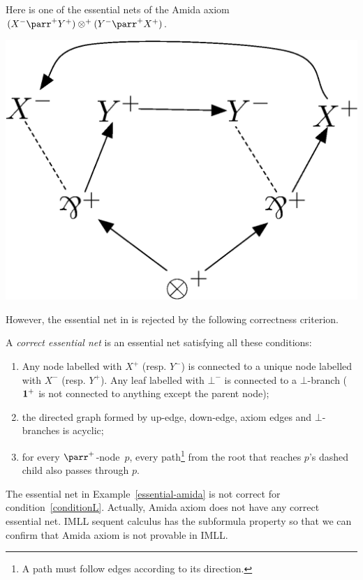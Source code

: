  \begin{example} \label{essential-amida}
  Here is one of the essential nets of
  the Amida axiom $(X^-\parr^+Y^+)\otimes^+(Y^-\parr^+ X^+)$.
   \begin{center}
    \includegraphics[scale=0.4]{amida-essential.eps}
   \end{center}
 \end{example}
 However, the essential net in  is rejected by
 the following correctness criterion.
  \begin{definition}
   A \textit{correct essential net} is an essential net satisfying all
   these conditions:
\begin{enumerate}
 \item Any node labelled with $X^+$ (resp. $Y^-$) is connected to a
       unique node labelled with $X^-$ (resp. $Y^+$).
       Any leaf labelled with $\bot^-$ is connected to a $\bot$-branch
       ($\mathbf{1}^+$ is not connected to anything except the parent node);
 \item the directed graph formed by up-edge, down-edge, axiom edges and
       $\bot$-branches is acyclic;
 \item \label{conditionL}
       for every $\parr^+$-node~$p$, every path\footnote{A path must
       follow edges according to its direction.}
       from the root that reaches
       $p$'s dashed child also passes through $p$.
\end{enumerate}
  \end{definition}
The essential net in Example~\ref{essential-amida} is not correct for
condition~\ref{conditionL}.  Actually, Amida axiom does not have
any correct essential net.  IMLL sequent calculus has the subformula
property so that we can confirm that Amida axiom is not provable in IMLL.

